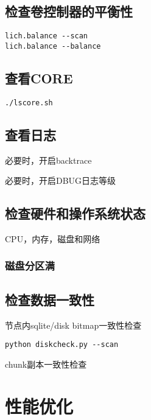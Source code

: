\subsection{检查卷控制器的平衡性}

\begin{lstlisting}
lich.balance --scan
lich.balance --balance
\end{lstlisting}

\subsection{查看CORE}

\begin{lstlisting}
./lscore.sh
\end{lstlisting}

\subsection{查看日志}

必要时，开启backtrace

必要时，开启DBUG日志等级

\subsection{检查硬件和操作系统状态}

CPU，内存，磁盘和网络

\subsubsection{磁盘分区满}




\subsection{检查数据一致性}

节点内sqlite/disk bitmap一致性检查

\begin{lstlisting}
python diskcheck.py --scan
\end{lstlisting}

chunk副本一致性检查

\section{性能优化}

